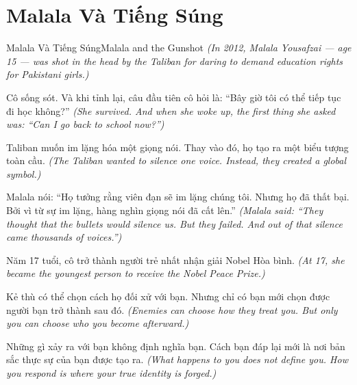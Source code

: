 \section{Malala Và Tiếng Súng}
\begin{truyen}{Malala Và Tiếng Súng}{Malala and the Gunshot}
\textit{(In 2012, Malala Yousafzai — age 15 — was shot in the head by the Taliban for daring to demand education rights for Pakistani girls.)}

Cô sống sót. Và khi tỉnh lại, câu đầu tiên cô hỏi là: ``Bây giờ tôi có thể tiếp tục đi học không?''
\textit{(She survived. And when she woke up, the first thing she asked was: ``Can I go back to school now?'')}

Taliban muốn im lặng hóa một giọng nói. Thay vào đó, họ tạo ra một biểu tượng toàn cầu.
\textit{(The Taliban wanted to silence one voice. Instead, they created a global symbol.)}

Malala nói: ``Họ tưởng rằng viên đạn sẽ im lặng chúng tôi. Nhưng họ đã thất bại. Bởi vì từ sự im lặng, hàng nghìn giọng nói đã cất lên.''
\textit{(Malala said: ``They thought that the bullets would silence us. But they failed. And out of that silence came thousands of voices.'')}

Năm 17 tuổi, cô trở thành người trẻ nhất nhận giải Nobel Hòa bình.
\textit{(At 17, she became the youngest person to receive the Nobel Peace Prize.)}

Kẻ thù có thể chọn cách họ đối xử với bạn. Nhưng chỉ có bạn mới chọn được người bạn trở thành sau đó.
\textit{(Enemies can choose how they treat you. But only you can choose who you become afterward.)}

\end{truyen}

\begin{baihoc}
Những gì xảy ra với bạn không định nghĩa bạn. Cách bạn đáp lại mới là nơi bản sắc thực sự của bạn được tạo ra.
\textit{(What happens to you does not define you. How you respond is where your true identity is forged.)}
\end{baihoc}
\ngancach

